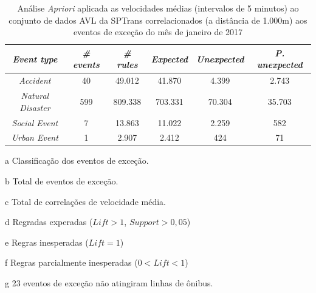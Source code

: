 \documentclass[
	12pt,				%
	oneside,			%
	a4paper,			%
	english,			%
	brazil				%
	]{abntex2ppgsi}
\begin{document}
\begin{apendicesenv}
\begin{table}[!htb]
\centering
\begin{threeparttable}
\caption {Análise \textit{Apriori} aplicada as velocidades médias (intervalos de 5 minutos) ao conjunto de dados AVL da SPTrans correlacionados (a distância de 1.000m) aos eventos de exceção do mês de janeiro de 2017}
\label {tab:aprioriFull}
\begin{tabular}{c|c|c|c|c|c}
\hline
\textbf{\textit{Event type}}\tnote{a} & \textbf{\textit{\# events}}\tnote{b} & \textit{\textbf{\# rules}}\tnote{c} & \textbf{\textit{Expected}}\tnote{d} & \textbf{\textit{Unexpected}}\tnote{e} & \textbf{\textit{P. unexpected}}\tnote{f}   \\
\hline
\textit{Accident} & 40 & 49.012 & 41.870 & 4.399 & 2.743 \\
\textit{Natural Disaster} & 599 & 809.338 & 703.331 & 70.304 & 35.703 \\
\textit{Social Event} & 7 & 13.863 & 11.022 & 2.259 & 582 \\
\textit{Urban Event} & 1 & 2.907 & 2.412 & 424 & 71 \\
\hline
\end{tabular}
\begin{tablenotes}
            \item[a] Classificação dos eventos de exceção.
            \item[b] Total de eventos de exceção.
            \item[c] Total de correlações de velocidade média.
            \item[d] Regradas experadas ($Lift > 1$, $Support > 0,05$)
            \item[e] Regras inesperadas ($Lift = 1$)
            \item[f] Regras parcialmente inesperadas ($0 < Lift < 1$)
            \item[g] 23 eventos de exceção não atingiram linhas de ônibus. 
        \end{tablenotes}
\end{threeparttable}
\end{table}


\end{apendicesenv}
\end{document}
